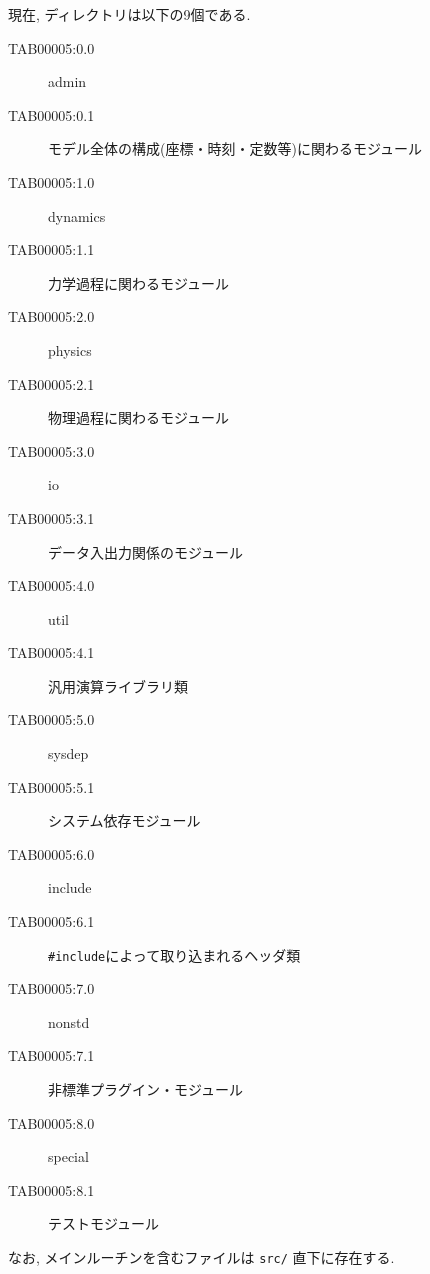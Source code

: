 現在, ディレクトリは以下の9個である. 
\begin{center}
\begin{description}
\item[TAB00005:0.0] admin
\item[TAB00005:0.1] モデル全体の構成(座標・時刻・定数等)に関わるモジュール
\item[TAB00005:1.0] dynamics
\item[TAB00005:1.1] 力学過程に関わるモジュール
\item[TAB00005:2.0] physics
\item[TAB00005:2.1] 物理過程に関わるモジュール
\item[TAB00005:3.0] io
\item[TAB00005:3.1] データ入出力関係のモジュール
\item[TAB00005:4.0] util
\item[TAB00005:4.1] 汎用演算ライブラリ類
\item[TAB00005:5.0] sysdep
\item[TAB00005:5.1] システム依存モジュール
\item[TAB00005:6.0] include
\item[TAB00005:6.1] {\tt \#include}によって取り込まれるヘッダ類
\item[TAB00005:7.0] nonstd
\item[TAB00005:7.1] 非標準プラグイン・モジュール
\item[TAB00005:8.0] special
\item[TAB00005:8.1] テストモジュール
\end{description}
\end{center}
なお, メインルーチンを含むファイルは {\tt src/} 直下に存在する.

